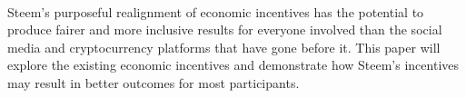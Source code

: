 \documentclass{article}
\begin{document}
        \paragraph{}
            Steem's purposeful realignment of economic incentives has the potential to produce fairer and more inclusive results for everyone involved than the social media and cryptocurrency platforms that have gone before it. This paper will explore the existing economic incentives and demonstrate how Steem's incentives may result in better outcomes for most participants.
\end{document}
